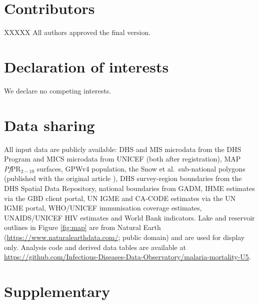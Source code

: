 \documentclass[12pt]{article}
\begin{document}
\section*{Contributors}
XXXXX All authors approved the final version.

\section*{Declaration of interests}
We declare no competing interests.

\section*{Data sharing}
All input data are publicly available: DHS and MIS microdata from the DHS Program and MICS microdata from UNICEF (both after registration), MAP \textit{Pf}PR$_{2-10}$ surfaces, GPWv4 population, the Snow et al.\ sub-national polygons (published with the original article \cite{snow:17}), DHS survey-region boundaries from the DHS Spatial Data Repository, national boundaries from GADM, IHME estimates via the GBD client portal, UN IGME and CA-CODE estimates via the UN IGME portal, WHO/UNICEF immunisation coverage estimates, UNAIDS/UNICEF HIV estimates and World Bank indicators. Lake and reservoir outlines in Figure \ref{fig:map} are from Natural Earth (\url{https://www.naturalearthdata.com/}; public domain) and are used for display only. Analysis code and derived data tables are available at \url{https://github.com/Infectious-Diseases-Data-Observatory/malaria-mortality-U5}.






\clearpage
\section*{Supplementary}
\renewcommand{\thefigure}{S\arabic{figure}}
\setcounter{figure}{0}

\renewcommand{\thetable}{S\arabic{table}}
\setcounter{table}{0}
\end{document}

